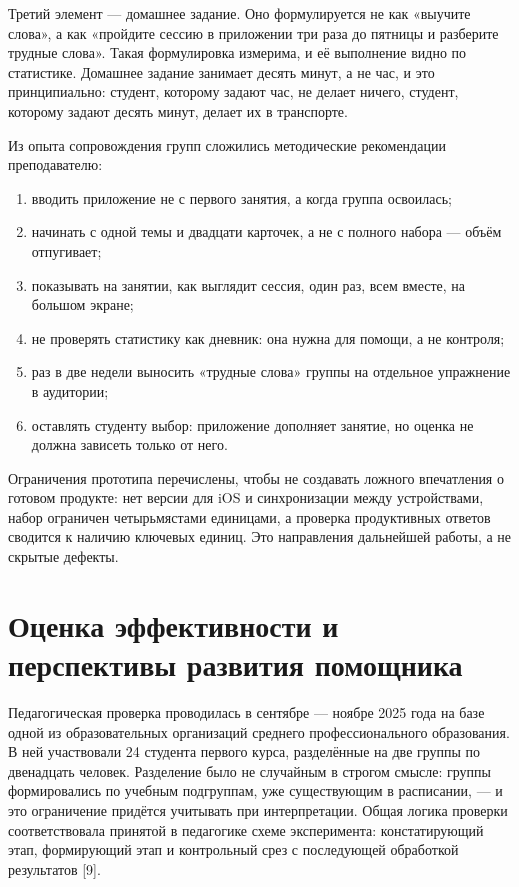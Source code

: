\documentclass[11pt,a4paper,openany]{report}
\begin{document}
Третий элемент — домашнее задание. Оно формулируется не как «выучите слова», а как «пройдите сессию в приложении три раза до пятницы и разберите трудные слова». Такая формулировка измерима, и её выполнение видно по статистике. Домашнее задание занимает десять минут, а не час, и это принципиально: студент, которому задают час, не делает ничего, студент, которому задают десять минут, делает их в транспорте.

Из опыта сопровождения групп сложились методические рекомендации преподавателю:

\begin{enumerate}

  \item вводить приложение не с первого занятия, а когда группа освоилась;

  \item начинать с одной темы и двадцати карточек, а не с полного набора — объём отпугивает;

  \item показывать на занятии, как выглядит сессия, один раз, всем вместе, на большом экране;

  \item не проверять статистику как дневник: она нужна для помощи, а не контроля;

  \item раз в две недели выносить «трудные слова» группы на отдельное упражнение в аудитории;

  \item оставлять студенту выбор: приложение дополняет занятие, но оценка не должна зависеть только от него.

\end{enumerate}

Ограничения прототипа перечислены, чтобы не создавать ложного впечатления о готовом продукте: нет версии для iOS и синхронизации между устройствами, набор ограничен четырьмястами единицами, а проверка продуктивных ответов сводится к наличию ключевых единиц. Это направления дальнейшей работы, а не скрытые дефекты.

\section{Оценка эффективности и перспективы развития помощника}

Педагогическая проверка проводилась в сентябре — ноябре 2025 года на базе одной из образовательных организаций среднего профессионального образования. В ней участвовали 24 студента первого курса, разделённые на две группы по двенадцать человек. Разделение было не случайным в строгом смысле: группы формировались по учебным подгруппам, уже существующим в расписании, — и это ограничение придётся учитывать при интерпретации. Общая логика проверки соответствовала принятой в педагогике схеме эксперимента: констатирующий этап, формирующий этап и контрольный срез с последующей обработкой результатов [9].
\end{document}
